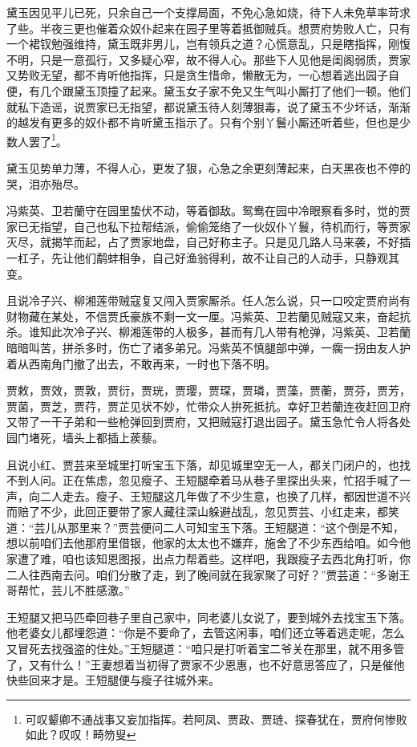\documentclass[12pt,oneside]{book}
\begin{document}
黛玉因见平儿已死，只余自己一个支撑局面，不免心急如烧，待下人未免草率苛求了些。半夜三更也催着众奴仆起来在园子里等着抵御贼兵。想贾府势败人亡，只有一个裙钗勉强维持，黛玉既非男儿，岂有领兵之道？心慌意乱，只是瞎指挥，刚愎不明，只是一意孤行，又多疑心窄，故不得人心。那些下人见他是闺阁弱质，贾家又势败无望，都不肯听他指挥，只是贪生惜命，懒散无为，一心想着逃出园子自便，有几个跟黛玉顶撞了起来。黛玉女子家不免又生气叫小厮打了他们一顿。他们就私下造谣，说贾家已无指望，都说黛玉待人刻薄狠毒，说了黛玉不少坏话，渐渐的越发有更多的奴仆都不肯听黛玉指示了。只有个别丫鬟小厮还听着些，但也是少数人罢了\footnote{可叹颦卿不通战事又妄加指挥。若阿凤、贾政、贾琏、探春犹在，贾府何惨败如此？叹叹！畸笏叟}。

黛玉见势单力薄，不得人心，更发了狠，心急之余更刻薄起来，白天黑夜也不停的哭，泪亦殆尽。

冯紫英、卫若蘭守在园里蛰伏不动，等着御敌。鸳鸯在园中冷眼察看多时，觉的贾家已无指望，自己也私下拉帮结派，偷偷笼络了一伙奴仆丫鬟，待机而行，等贾家灭尽，就揭竿而起，占了贾家地盘，自己好称主子。只是见几路人马来袭，不好插一杠子，先让他们鹬蚌相争，自己好渔翁得利，故不让自己的人动手，只静观其变。

且说冷子兴、柳湘莲带贼寇复又闯入贾家厮杀。任人怎么说，只一口咬定贾府尚有财物藏在某处，不信贾氏豪族不剩一文一厘。冯紫英、卫若蘭见贼寇又来，奋起抗杀。谁知此次冷子兴、柳湘莲带的人极多，甚而有几人带有枪弹，冯紫英、卫若蘭暗暗叫苦，拼杀多时，伤亡了诸多弟兄。冯紫英不慎腿部中弹，一瘸一拐由友人护着从西南角门撤了出去，不敢再来，一时也下落不明。

贾敕，贾效，贾敦，贾衍，贾珖，贾璎，贾琛，贾璘，贾藻，贾蘅，贾芬，贾芳，贾菌，贾芝，贾荇，贾芷见状不妙，忙带众人拚死抵抗。幸好卫若蘭连夜赶回卫府又带了一干子弟和一些枪弹回到贾府，又把贼寇打退出园子。黛玉急忙令人将各处园门堵死，墙头上都插上蒺藜。

且说小红、贾芸来至城里打听宝玉下落，却见城里空无一人，都关门闭户的，也找不到人问。正在焦虑，忽见瘦子、王短腿牵着马从巷子里探出头来，忙招手喊了一声，向二人走去。瘦子、王短腿这几年做了不少生意，也换了几样，都因世道不兴而赔了不少，此回正要带了家人藏往深山躲避战乱，忽见贾芸、小红走来，都笑道：“芸儿从那里来？”贾芸便问二人可知宝玉下落。王短腿道：“这个倒是不知，想以前咱们去他那府里借银，他家的太太也不嫌弃，施舍了不少东西给咱。如今他家遭了难，咱也该知恩图报，出点力帮着些。这样吧，我跟瘦子去西北角打听，你二人往西南去问。咱们分散了走，到了晚间就在我家聚了可好？”贾芸道：“多谢王哥帮忙，芸儿不胜感激。”

王短腿又把马匹牵回巷子里自己家中，同老婆儿女说了，要到城外去找宝玉下落。他老婆女儿都埋怨道：“你是不要命了，去管这闲事，咱们还立等着逃走呢，怎么又冒死去找强盗的住处。”王短腿道：“咱只是打听着宝二爷关在那里，就不用多管了，又有什么！”王妻想着当初得了贾家不少恩惠，也不好意思答应了，只是催他快些回来才是。王短腿便与瘦子往城外来。
\end{document}
